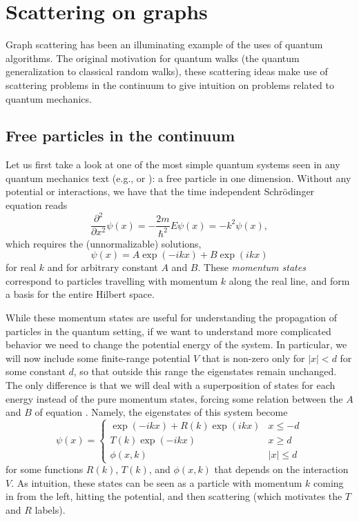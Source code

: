 \documentclass[../thesis-main/thesis-main]{subfiles}
\begin{document}
\chapter{Scattering on graphs}

Graph scattering has been an illuminating example of the uses of quantum algorithms.  The original motivation for quantum walks (the quantum generalization to classical random walks), these scattering ideas make use of scattering problems in the continuum to give intuition on problems related to quantum mechanics.



\section{Free particles in the continuum}

Let us first take a look at one of the most simple quantum systems seen in any quantum mechanics text (e.g., \cite{GriQM} or \cite{SakMQM}): a free particle in one dimension.  Without any potential or interactions, we have that the time independent Schr\"{o}dinger equation reads
\begin{equation}
  \frac{\partial^2}{\partial x^2} \psi(x) = -\frac{2m}{\hbar^2}E \psi(x) = -k^2 \psi(x),
\end{equation}
which requires the (unnormalizable) solutions,
\begin{equation}
  \psi(x) = A \exp(- i k x) + B \exp(i k x) \label{eq:simple_motivating_momentum_states}
\end{equation}
for real $k$ and for arbitrary constant $A$ and $B$.  These \textit{momentum states} correspond to particles travelling with momentum $k$ along the real line, and form a basis for the entire Hilbert space.

While these momentum states are useful for understanding the propagation of particles in the quantum setting, if we want to understand more complicated behavior we need to change the potential energy of the system.  In particular, we will now include some finite-range potential $V$ that is non-zero only for $|x| < d$ for some constant $d$, so that outside this range the eigenstates remain unchanged.  The only difference is that we will deal with a superposition of states for each energy instead of the pure momentum states, forcing some relation between the $A$ and $B$ of equation .  Namely, the eigenstates of this system become
\begin{equation}
  \psi(x) = \begin{cases}
    \exp(-i k x) + R(k) \exp(i k x) & x \leq -d\\
    T(k) \exp(- i k x) & x \geq d\\
    \phi(x,k) & |x| \leq d
    \end{cases}
\end{equation}
for some functions $R(k)$, $T(k)$, and $\phi(x,k)$ that depends on the interaction $V$.  As intuition, these states can be seen as a particle with momentum $k$ coming in from the left, hitting the potential, and then scattering (which motivates the $T$ and $R$ labels).  
\end{document}
